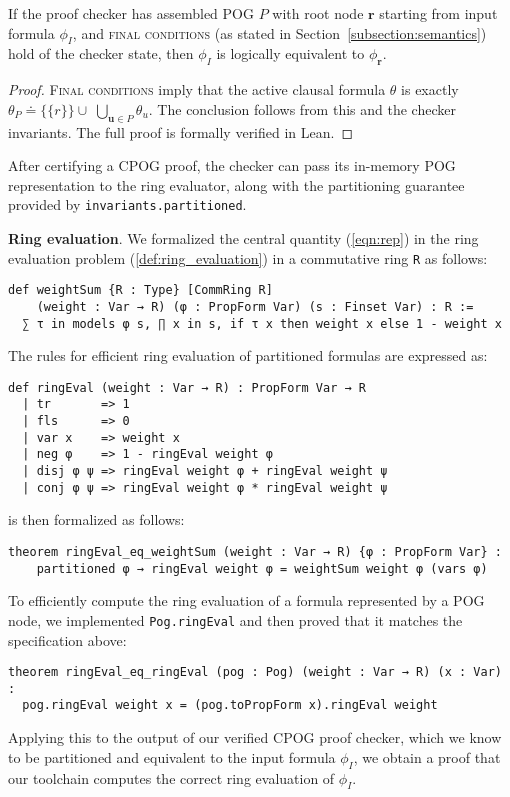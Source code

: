 \documentclass[letterpaper,USenglish,cleveref, autoref, thm-restate]{lipics-v2021}
\newcommand{\inputformula}{\phi_I}
\newcommand{\pogformula}{\theta_P}
\newcommand{\makenode}[1]{\mathbf{#1}}
\newcommand{\nodeu}{\makenode{u}}
\newcommand{\noder}{\makenode{r}}
\begin{document}
\begin{theorem}
\label{thm:lean:equiv}
If the proof checker has assembled POG $P$ with root node $\noder$ starting from input formula $\inputformula$, and \textsc{final conditions} (as stated in Section~\ref{subsection:semantics}) hold of the checker state, then $\inputformula$ is logically equivalent to $\phi_\noder$.
\end{theorem}
\begin{proof}
\textsc{Final conditions} imply that the active clausal formula $\theta$ is exactly $\pogformula \doteq \{\{r\}\} \cup \; \bigcup_{\nodeu \in P} \theta_{u}$. The conclusion follows from this and the checker invariants. The full proof is formally verified in Lean.
\end{proof}
After certifying a CPOG proof, the checker can pass its in-memory POG representation to the ring evaluator, along with the partitioning guarantee provided by \texttt{invariants.partitioned}.

\vspace{1em}\noindent
\textbf{Ring evaluation}. We formalized the central quantity (\ref{eqn:rep}) in the ring evaluation problem
(\cref{def:ring_evaluation}) in a commutative ring \lstinline{R} as follows:
\begin{lstlisting}
def weightSum {R : Type} [CommRing R]
    (weight : Var → R) (φ : PropForm Var) (s : Finset Var) : R :=
  ∑ τ in models φ s, ∏ x in s, if τ x then weight x else 1 - weight x
\end{lstlisting}
The rules for efficient ring evaluation of partitioned formulas are expressed as:
\begin{lstlisting}
def ringEval (weight : Var → R) : PropForm Var → R
  | tr       => 1
  | fls      => 0
  | var x    => weight x
  | neg φ    => 1 - ringEval weight φ
  | disj φ ψ => ringEval weight φ + ringEval weight ψ
  | conj φ ψ => ringEval weight φ * ringEval weight ψ
\end{lstlisting}
 is then formalized as follows:
\begin{lstlisting}
theorem ringEval_eq_weightSum (weight : Var → R) {φ : PropForm Var} :
    partitioned φ → ringEval weight φ = weightSum weight φ (vars φ)
\end{lstlisting}
To efficiently compute the ring evaluation of a formula represented by a POG node, we implemented
\lstinline{Pog.ringEval} and then proved that it matches the specification above:
\begin{lstlisting}
theorem ringEval_eq_ringEval (pog : Pog) (weight : Var → R) (x : Var) :
  pog.ringEval weight x = (pog.toPropForm x).ringEval weight
\end{lstlisting}
Applying this to the output of our verified CPOG proof checker, which we know to be partitioned
and equivalent to the input formula $\inputformula$, we obtain a proof that our toolchain computes
the correct ring evaluation of $\inputformula$.
\end{document}
